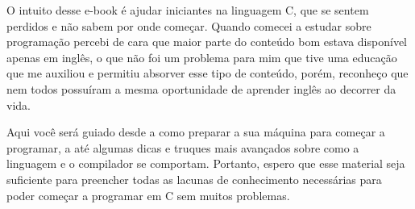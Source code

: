 O intuito desse e-book é ajudar iniciantes na linguagem C, que se 
sentem perdidos e não sabem por onde começar. Quando comecei a estudar sobre 
programação percebi de cara que maior parte do conteúdo bom estava disponível 
apenas em inglês, o que não foi um problema para mim que tive uma educação 
que me auxiliou e permitiu absorver esse tipo de conteúdo, porém, reconheço 
que nem todos possuíram a mesma oportunidade de aprender inglês ao decorrer 
da vida.

Aqui você será guiado desde a como preparar a sua máquina para começar 
a programar, a até algumas dicas e truques mais avançados sobre como a linguagem 
e o compilador se comportam. Portanto, espero que esse material seja suficiente 
para preencher todas as lacunas de conhecimento necessárias para poder começar 
a programar em C sem muitos problemas.
